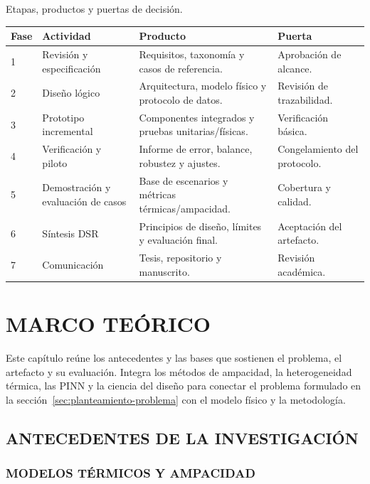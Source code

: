 \documentclass[11pt,a4paper,oneside]{report}
\begin{document}
\begin{procedure}[htbp]
\caption{Etapas, productos y puertas de decisión.}
\label{proc:etapas}
\begin{tabularx}{\textwidth}{C{1.0cm}L{3.4cm}Y L{3.2cm}}
\toprule
\textbf{Fase} & \textbf{Actividad} & \textbf{Producto} & \textbf{Puerta} \\
 & Revisión y especificación & Requisitos, taxonomía y casos de referencia. & Aprobación de alcance. \\
2 & Diseño lógico & Arquitectura, modelo físico y protocolo de datos. & Revisión de trazabilidad. \\
3 & Prototipo incremental & Componentes integrados y pruebas unitarias/físicas. & Verificación básica. \\
4 & Verificación y piloto & Informe de error, balance, robustez y ajustes. & Congelamiento del protocolo. \\
5 & Demostración y evaluación de casos & Base de escenarios y métricas térmicas/ampacidad. & Cobertura y calidad. \\
6 & Síntesis DSR & Principios de diseño, límites y evaluación final. & Aceptación del artefacto. \\
7 & Comunicación & Tesis, repositorio y manuscrito. & Revisión académica. \\
\bottomrule
\end{tabularx}
\end{procedure}

\chapter{MARCO TEÓRICO}
\label{ch:marco-teorico}
\thispagestyle{empty}

Este capítulo reúne los antecedentes y las bases que sostienen el problema, el artefacto y su evaluación. Integra los métodos de ampacidad, la heterogeneidad térmica, las PINN y la ciencia del diseño para conectar el problema formulado en la sección~\ref{sec:planteamiento-problema} con el modelo físico y la metodología.

\section{ANTECEDENTES DE LA INVESTIGACIÓN}
\label{sec:antecedentes}

\subsection{MODELOS TÉRMICOS Y AMPACIDAD}
\end{document}
